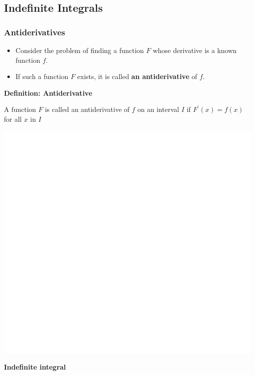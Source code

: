 \documentclass[]{book}
\begin{document}
\hypertarget{indefinite-integrals}{%
\subsection{Indefinite Integrals}\label{indefinite-integrals}}

\hypertarget{antiderivatives}{%
\subsubsection{Antiderivatives}\label{antiderivatives}}

\begin{itemize}
\item
  Consider the problem of finding a function \(F\) whose derivative is a known function \(f\).
\item
  If such a function \(F\) exists, it is called \textbf{an antiderivative} of \(f\).
\end{itemize}

\textbf{Definition: Antiderivative}

A function \(F\) is called an antiderivative of \(f\) on an interval \(I\) if \(F^\prime(x) = f(x)\) for all \(x\) in \(I\)

\begin{center}\includegraphics[width=1\linewidth]{figure/LB39-1} \end{center}

\textbf{Indefinite integral}
\end{document}
